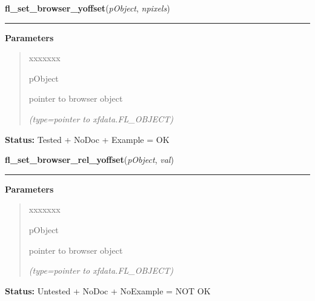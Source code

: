 \hspace{.8\funcindent}\begin{boxedminipage}{\funcwidth}

    \raggedright \textbf{fl\_set\_browser\_yoffset}(\textit{pObject}, \textit{npixels})

    \vspace{-1.5ex}

    \rule{\textwidth}{0.5\fboxrule}
\setlength{\parskip}{2ex}
\setlength{\parskip}{1ex}
      \textbf{Parameters}
      \vspace{-1ex}

      \begin{quote}
        \begin{Ventry}{xxxxxxx}

          \item[pObject]

          pointer to browser object

            {\it (type=pointer to xfdata.FL\_OBJECT)}

        \end{Ventry}

      \end{quote}

\textbf{Status:} Tested + NoDoc + Example = OK



    \end{boxedminipage}

    \label{xformslib:library:fl_set_browser_rel_yoffset}

    \vspace{0.5ex}

\hspace{.8\funcindent}\begin{boxedminipage}{\funcwidth}

    \raggedright \textbf{fl\_set\_browser\_rel\_yoffset}(\textit{pObject}, \textit{val})

    \vspace{-1.5ex}

    \rule{\textwidth}{0.5\fboxrule}
\setlength{\parskip}{2ex}
\setlength{\parskip}{1ex}
      \textbf{Parameters}
      \vspace{-1ex}

      \begin{quote}
        \begin{Ventry}{xxxxxxx}

          \item[pObject]

          pointer to browser object

            {\it (type=pointer to xfdata.FL\_OBJECT)}

        \end{Ventry}

      \end{quote}

\textbf{Status:} Untested + NoDoc + NoExample = NOT OK



    \end{boxedminipage}

